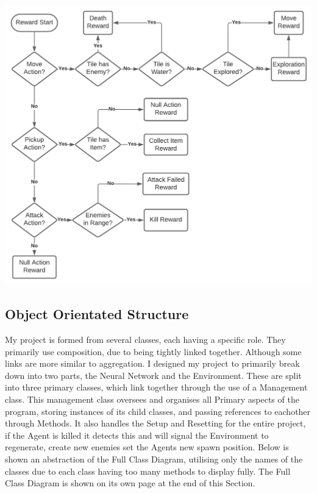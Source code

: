\begin{flushleft}
\begin{center}
                \includegraphics[width=\textwidth]{Images/Design/RewardActionStructure.png}
            \end{center}   
        \subsection{Object Orientated Structure}
            \large
            My project is formed from several classes, each having a specific role. They primarily use composition, due to being tightly linked
            together. Although some links are more similar to aggregation. I designed my project to primarily break down into two parts, the
            Neural Network and the Environment. These are split into three primary classes, which link together through the use of a Management
            class. This management class oversees and organises all Primary aspects of the program, storing instances of its child classes, and
            passing references to eachother through Methods. It also handles the Setup and Resetting for the entire project, if the Agent is killed
            it detects this and will signal the Environment to regenerate, create new enemies set the Agents new spawn position. Below is shown an 
            abstraction of the Full Class Diagram, utilising only the names of the classes due to each class having too many methods to display fully.
            The Full Class Diagram is shown on its own page at the end of this Section.


\end{flushleft}
